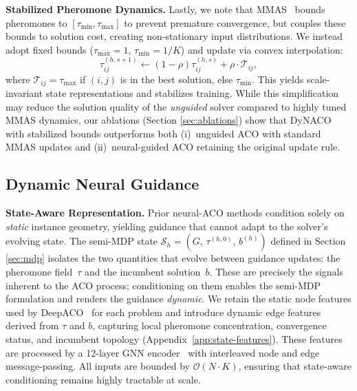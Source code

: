 \documentclass[sigconf]{acmart}
\newcommand{\MMAS}{\textsc{MMAS}}
\begin{document}
\smallskip\noindent\textbf{Stabilized Pheromone Dynamics.}
\label{sec:smoothed-mmas}
Lastly, we note that \MMAS{}~\cite{maxmin} bounds pheromones to $[\tau_{\min}, \tau_{\max}]$ to prevent premature convergence, but couples these bounds to solution cost, creating non-stationary input distributions. We instead adopt fixed bounds ($\tau_{\max}{=}1$, $\tau_{\min}{=}1/K$) and update via convex interpolation:
\begin{equation}
\tau^{(h,s+1)}_{ij} \leftarrow (1-\rho)\tau^{(h,s)}_{ij} + \rho \cdot \mathcal{T}_{ij},
\label{eq:smoothed-mmas}
\end{equation}
where $\mathcal{T}_{ij} = \tau_{\max}$ if $(i,j)$ is in the best solution, else $\tau_{\min}$.
This yields scale-invariant state representations and stabilizes training.
While this simplification may reduce the solution quality of the \emph{unguided} solver compared to highly tuned \MMAS{} dynamics, our ablations (Section \ref{sec:ablations}) show that DyNACO with stabilized bounds outperforms both (i)~unguided ACO with standard \MMAS{} updates and (ii)~neural-guided ACO retaining the original update rule.

\subsection{Dynamic Neural Guidance}
\label{sec:agent}


\smallskip\noindent\textbf{State-Aware Representation.}
\label{sec:state}
Prior neural-ACO methods condition solely on \emph{static} instance geometry, yielding guidance that cannot adapt to the solver's evolving state. The semi-MDP state $\mathcal{S}_h = (G,\, \tau^{(h,0)},\, b^{(h)})$ defined in Section \ref{sec:mdp} isolates the two quantities that evolve between guidance updates: the pheromone field~$\tau$ and the incumbent solution~$b$. These are precisely the signals inherent to the ACO process; conditioning on them enables the semi-MDP formulation and renders the guidance \emph{dynamic}. We retain the static node features used by DeepACO~\cite{deepaco} for each problem and introduce dynamic edge features derived from $\tau$ and $b$, capturing local pheromone concentration, convergence status, and incumbent topology (Appendix~\ref{app:state-features}). These features are processed by a 12-layer GNN encoder~\cite{deepaco} with interleaved node and edge message-passing. All inputs are bounded by $\mathcal{O}(N \cdot K)$, ensuring that state-aware conditioning remains highly tractable at scale.
\end{document}
